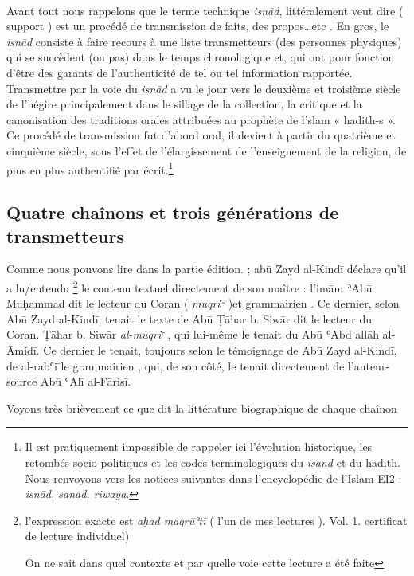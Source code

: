 \documentclass[a4paper,12pt]{report}
\begin{document}
\paragraph{}
Avant tout nous rappelons  que  le terme technique  \textit{isnād}, littéralement  veut dire ( support ) est un procédé de transmission de faits, des propos…etc .  En gros, le \textit{isnād} consiste  à faire recours à une liste transmetteurs (des personnes physiques) qui se succèdent  (ou pas)  dans le temps chronologique et, qui ont pour fonction d’être des garants de l’authenticité de tel ou tel information rapportée. 
Transmettre par la voie du  \textit{isnād} a vu le jour vers le  deuxième et troisième siècle de l’hégire principalement dans le sillage de  la collection, la critique et la canonisation des traditions orales attribuées au prophète de l’slam « hadith-s ». Ce procédé de transmission fut d’abord oral, il devient à partir du quatrième et cinquième siècle, sous l’effet de l’élargissement de l’enseignement de la religion, de plus en plus authentifié par écrit.\footnote {Il est pratiquement impossible de rappeler ici l’évolution historique, les retombés socio-politiques et les codes terminologiques  du \textit{isan̄d} et du hadith. Nous renvoyons vers les notices suivantes dans l’encyclopédie de l’Islam EI2 : \textit{isnād, sanad, riwaya}.}


\subsection{Quatre  chaînons et trois générations de transmetteurs} 

Comme nous pouvons lire dans la partie édition. ; abū Zayd al-Kindī  déclare qu’il a lu/entendu \footnote{ l'expression exacte est \textit{aḥad maqrūʾtī}  ( l’un de mes lectures ). Vol. 1. certificat de lecture individuel)

On ne sait  dans quel contexte et par quelle voie cette lecture a été faite  }  le contenu textuel directement  de son maître : l’imām ʾAbū Muḥammad dit
le lecteur du Coran ( \textit{muqriʾ} )et  grammairien . Ce dernier, selon Abū Zayd al-Kindī, tenait le texte  de Abū Ṭāhar b. Siwār dit le lecteur du Coran. Ṭāhar b. Siwār \textit{al-muqriᶜ} , qui lui-même le tenait du Ab\=u ʿAbd allāh al-Āmidī. Ce dernier le tenait, toujours selon le témoignage de Abū Zayd al-Kindī, de al-rabʿi  ̄le grammairien , qui, de son côté, le tenait directement de l’auteur-source Abū ʿAlī al-Fārisī.   


Voyons très brièvement ce que dit la littérature biographique de chaque chaînon 
\end{document}
